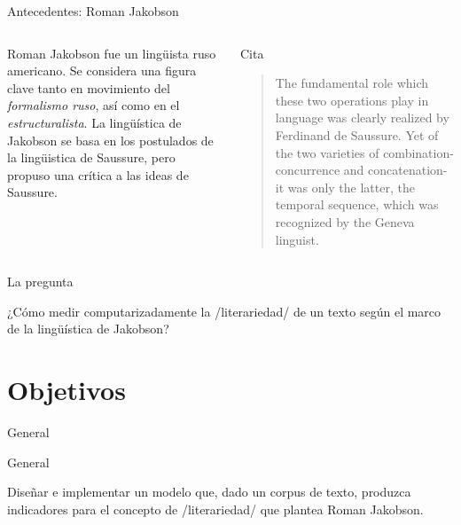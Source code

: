 \documentclass[presentation]{beamer}
\begin{document}
\begin{frame}[label={sec:orge7ea00a}]{Antecedentes: Roman Jakobson}
\begin{columns}
\begin{column}{0.48\columnwidth}
Roman Jakobson fue un lingüista ruso americano. Se considera una
figura clave tanto en movimiento del \emph{formalismo ruso}, así como
en el \emph{estructuralista}.  La lingüística de Jakobson se basa en
los postulados de la lingüistica de Saussure, \alert{pero} propuso una
crítica a las ideas de Saussure.
\end{column}


\begin{column}{0.48\columnwidth}
\begin{block}{Cita}
\begin{quote}
The fundamental role which these two operations play in language
was clearly realized by Ferdinand de Saussure. Yet of the two
varieties of combination-concurrence and concatenation-it was only
the latter, the temporal sequence, which was recognized by the
Geneva linguist. 
\cite[99]{jakobson1956two}
\end{quote}
\end{block}
\end{column}
\end{columns}
\end{frame}




\begin{frame}[label={sec:orgb052797}]{La pregunta}
\begin{block}{}
   ¿Cómo medir
   computarizadamente la /literariedad/ de un texto según el marco de la
   lingüística de Jakobson?
\end{block}
\end{frame}


\section{Objetivos}
\label{sec:org0a32bb7}
\begin{frame}[label={sec:org9060b0d}]{General}
   \begin{block}{General}

Diseñar e implementar un modelo que, dado un corpus de texto, produzca
   indicadores para el concepto de /literariedad/ que plantea Roman Jakobson.
     \end{block}
\end{frame}
\end{document}
